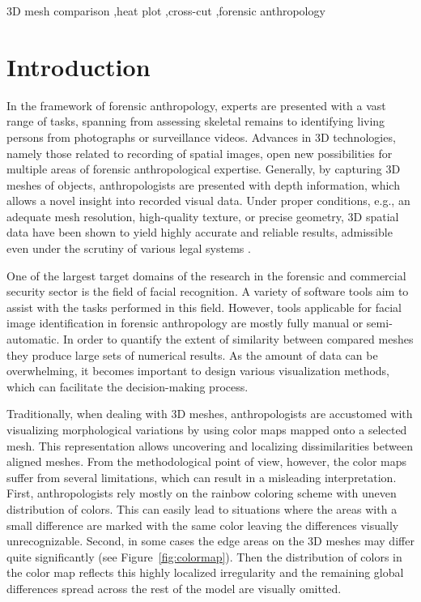 \documentclass[final,5p,times]{elsarticle}
\begin{document}
\begin{frontmatter}
\begin{keyword}
3D mesh comparison \sep heat plot \sep cross-cut \sep forensic anthropology

\end{keyword}

\end{frontmatter}




\section{Introduction}
In the framework of forensic anthropology, experts are presented with a vast range of tasks, spanning from assessing skeletal remains to identifying living persons from photographs or surveillance videos. 
Advances in 3D technologies, namely those related to recording of spatial images, open new possibilities for multiple areas of forensic anthropological expertise.
Generally, by capturing 3D meshes of objects, anthropologists are presented with depth information, which allows a novel insight into recorded visual data. 
Under proper conditions, e.g., an adequate mesh resolution, high-quality texture, or precise geometry, 3D spatial data have been shown to yield highly accurate and reliable results, admissible even under the scrutiny of various legal systems \cite{urbanova2015testing}.

One of the largest target domains of the research in the forensic and commercial security sector is the field of facial recognition. 
A variety of software tools aim to assist with the tasks performed in this field.
However, tools applicable for facial image identification in forensic anthropology are mostly fully manual or semi-automatic.
In order to quantify the extent of similarity between compared meshes they produce large sets of numerical results. 
As the amount of data can be overwhelming, it becomes important to design various visualization methods, which can facilitate the decision-making process.

Traditionally, when dealing with 3D meshes, anthropologists are accustomed with visualizing morphological variations by using color maps mapped onto a selected mesh.
This representation allows uncovering and localizing dissimilarities between aligned meshes. 
From the methodological point of view, however, the color maps suffer from several limitations, which can result in a misleading interpretation.
First, anthropologists rely mostly on the rainbow coloring scheme with uneven distribution of colors. 
This can easily lead to situations where the areas with a small difference are marked with the same color leaving the differences visually unrecognizable.
Second, in some cases the edge areas on the 3D meshes may differ quite significantly (see Figure~\ref{fig:colormap}).
Then the distribution of colors in the color map reflects this highly localized irregularity and the remaining global differences spread across the rest of the model are visually omitted.
\end{document}
